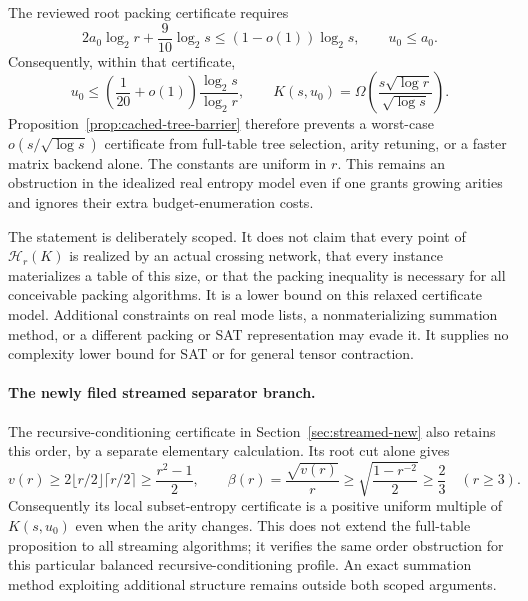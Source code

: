 The reviewed root packing certificate requires
\[
 2a_0\log_2r+\frac9{10}\log_2s
     \le(1-o(1))\log_2s,\qquad u_0\le a_0.
\]
Consequently, within that certificate,
\[
 u_0\le\left(\frac1{20}+o(1)\right)
                  \frac{\log_2s}{\log_2r},\qquad
 K(s,u_0)=\Omega\left(
          \frac{s\sqrt{\log r}}{\sqrt{\log s}}\right).
\]
Proposition~\ref{prop:cached-tree-barrier} therefore prevents a worst-case
$o(s/\sqrt{\log s})$ certificate from full-table tree selection, arity
retuning, or a faster matrix backend alone. The constants are uniform in
$r$. This remains an obstruction in the idealized real entropy model even
if one grants growing arities and ignores their extra budget-enumeration
costs.

The statement is deliberately scoped. It does not claim that every point
of $\mathcal H_r(K)$ is realized by an actual crossing network, that every
instance materializes a table of this size, or that the packing inequality
is necessary for all conceivable packing algorithms. It is a lower bound
on this relaxed certificate model. Additional constraints on real mode
lists, a nonmaterializing summation method, or a different packing or SAT
representation may evade it. It supplies no complexity lower bound for
SAT or for general tensor contraction.

\paragraph{The newly filed streamed separator branch.}
The recursive-conditioning certificate in Section~\ref{sec:streamed-new}
also retains this order, by a separate elementary calculation. Its root cut
alone gives
\[
 v(r)\ge2\lfloor r/2\rfloor\lceil r/2\rceil
       \ge\frac{r^2-1}{2},\qquad
 \beta(r)=\frac{\sqrt{v(r)}}r
       \ge\sqrt{\frac{1-r^{-2}}2}\ge\frac23\quad(r\ge3).
\]
Consequently its local subset-entropy certificate is a positive uniform
multiple of $K(s,u_0)$ even when the arity changes. This does not extend the
full-table proposition to all streaming algorithms; it verifies the same
order obstruction for this particular balanced recursive-conditioning
profile. An exact summation method exploiting additional structure remains
outside both scoped arguments.
